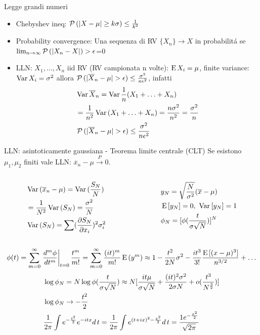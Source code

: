\begin{frame}{Legge grandi numeri}
\begin{itemize}
\item Chebyshev ineq: $\prob{(|X-\mu|\geq k\sigma)}\leq\frac{1}{k^2}$
\item Probability convergence: 	Una sequenza di RV $\{X_n\}\to X$ in probabilit\'a se $\lim_{n\to\infty}\prob{(|X_n-X|)>\epsilon}$=0
\item LLN: $X_1,\ldots,X_n$ iid RV (RV campionata n volte): $\E{X_i}=\mu$, finite variance: $\var{X_i}=\sigma^2$ allora $\prob{(|\overline{X}_n-\mu|>\epsilon)}\leq\frac{\sigma^2}{n\epsilon^2}$, infatti
\begin{align*}
&\var{\overline{X}_n}=\var{\frac{1}{n}(X_1+\ldots+X_n)}\\
&=\frac{1}{n^2}\var{(X_1+\ldots+X_n)}=\frac{n\sigma^2}{n^2}=\frac{\sigma^2}{n}\\
&\prob{(|\overline{X}_n-\mu|>\epsilon)}\leq\frac{\sigma^2}{n\epsilon^2}
\end{align*}
\end{itemize}
\end{frame}

\begin{frame}{LLN: asintoticamente gaussiana - Teorema limite centrale (CLT)}
Se esistono $\mu_1, \mu_2$ finiti vale LLN: $\overline{x}_n-\mu\xrightarrow{P}0$.
\begin{columns}[T]
	\begin{column}{0.5\textwidth}
		\begin{align*}
		&\var{(\overline{x}_n-\mu)}=\var{(\frac{S_N}{N})}\\
		&=\frac{1}{N^2}\var{(S_N)}=\frac{\sigma^2}{N}\\
		&\var{(S_N)}=\sum(\PDy{x_i}{S_N})^2\sigma_i^2
		\end{align*}
	\end{column}
	\begin{column}{0.5\textwidth}
		\begin{align*}
		&y_N=\sqrt{\frac{N}{\sigma^2}}(\overline{x}-\mu)\\
		&\E{[y_N]}=0,\ \var{[y_N]}=1\\
		&\phi_N=[\phi(\frac{t}{\sigma\sqrt{N}})]^N
		\end{align*}
	\end{column}
\end{columns}
\[\phi(t)=\sum_{m=0}^{\infty}\left.\frac{d^m\phi}{dt^m}\right|_{t=0}\frac{t^m}{m!}=\sum_{m=0}^{\infty}\frac{(it)^m}{m!}\E{(y^m)}\approx1-\frac{t^2}{2N}\sigma^2-\frac{it^3}{3!}\frac{\E{[(x-\mu)^3]}}{n\expy{3/2}}+\ldots\]
\begin{align*}
&\log{\phi_N}=N\log{\phi(\frac{t}{\sigma\sqrt{N}})}\approx N[\frac{it\mu}{\sigma\sqrt{N}}+\frac{(it)^2\sigma^2}{2\sigma N}+o(\frac{t^3}{N\expy{\frac{3}{2}}})]\\
&\log{\phi_N}\to-\frac{t^2}{2}\\
&\frac{1}{2\pi}\int\exp{-\frac{t^2}{2}}\exp{-itx}d\,t=\frac{1}{2\pi}\int\exp{(t+ix)^2-\frac{x^2}{2}}d\,t=\frac{1\exp{-\frac{x^2}{2}}}{\sqrt{2\pi}}
\end{align*}
\end{frame}

